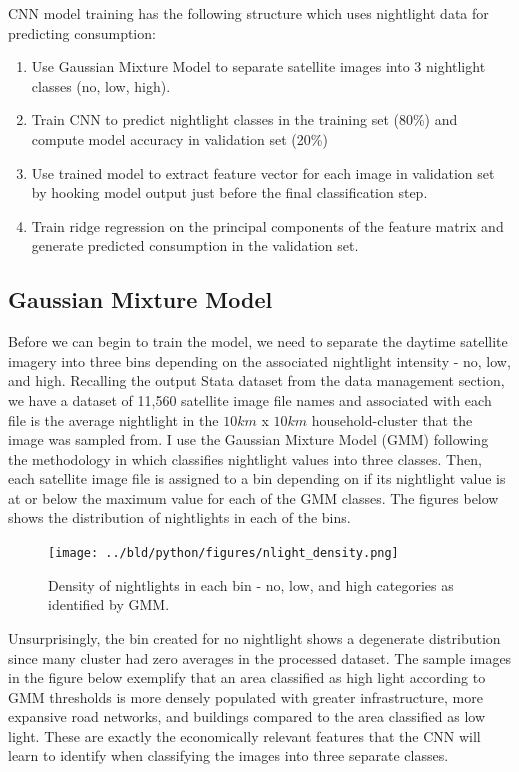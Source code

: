 \documentclass[11pt, a4paper, leqno]{article}
\begin{document}
CNN model training has the following structure which uses nightlight data for predicting consumption:

\begin{enumerate}
	\item Use Gaussian Mixture Model to separate satellite images into 3 nightlight classes (no, low, high).
	\item Train CNN to predict nightlight classes in the training set (80\%) and compute model accuracy in validation set (20\%)
	\item Use trained model to extract feature vector for each image in validation set by hooking model output just before the final classification step.
	\item Train ridge regression on the principal components of the feature matrix and generate predicted consumption in the validation set.
\end{enumerate}

\subsection{Gaussian Mixture Model}

Before we can begin to train the model, we need to separate the daytime satellite imagery into three bins depending on the associated nightlight intensity - no, low, and high. Recalling the output Stata dataset from the data management section, we have a dataset of 11,560 satellite image file names and associated with each file is the average nightlight in the $10km$ x $10km$ household-cluster that the image was sampled from. I use the Gaussian Mixture Model (GMM) following the methodology in \citet{jean2016combining} which classifies nightlight values into three classes. Then, each satellite image file is assigned to a bin depending on if its nightlight value is at or below the maximum value for each of the GMM classes. The figures below shows the distribution of nightlights in each of the bins.

\begin{figure}[H]

\centering
    \texttt{[image: ../bld/python/figures/nlight\_density.png]}
    \caption{Density of nightlights in each bin - no, low, and high categories as identified by GMM.}
    \label{fig:python-predictions}

\end{figure}

 Unsurprisingly, the bin created for no nightlight shows a degenerate distribution since many cluster had zero averages in the processed dataset. The sample images in the figure below exemplify that an area classified as high light according to GMM thresholds is more densely populated with greater infrastructure, more expansive road networks, and buildings compared to the area classified as low light. These are exactly the economically relevant features that the CNN will learn to identify when classifying the images into three separate classes. 
\end{document}
